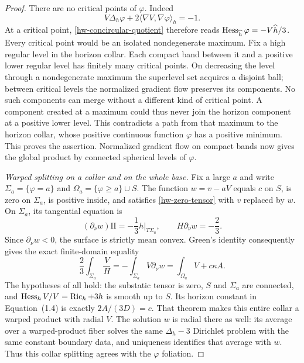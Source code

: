 \begin{proof}
There are no critical points of $\varphi$.
Indeed
\[
 V\Delta_h\varphi+2\langle\nabla V,\nabla\varphi\rangle_h=-1.
\]
At a critical point, \eqref{hw-concircular-quotient} therefore
reads
$\operatorname{Hess}_{\widehat h}\varphi=-V\widehat h/3$.
Every critical point would be an isolated nondegenerate maximum.
Fix a high regular level in the horizon collar.  Each compact band
between it and a positive lower regular level has finitely many
critical points.  On decreasing the level through a nondegenerate
maximum the superlevel set acquires a disjoint ball; between
critical levels the normalized gradient flow preserves its
components.  No such components can merge without a different
kind of critical point.  A component created at a maximum could
thus never join the horizon component at a positive lower level.
This contradicts a path from that maximum to the horizon collar,
whose positive continuous function $\varphi$ has a positive
minimum.  This proves the assertion.
Normalized gradient flow on compact bands now gives the global
product by connected spherical levels of $\varphi$.

\emph{Warped splitting on a collar and on the whole base.}
Fix a large $a$ and write $\Sigma_a=\{\varphi=a\}$ and
$\Omega_a=\{\varphi\geq a\}\cup S$.
The function $w=v-aV$ equals $c$ on $S$, is zero on $\Sigma_a$,
is positive inside, and satisfies \eqref{hw-zero-tensor} with
$v$ replaced by $w$.  On $\Sigma_a$, its tangential equation is
\[
 (\partial_\nu w)\mathrm{II}=-\frac13h|_{T\Sigma_a},
 \qquad H\partial_\nu w=-\frac23.
\]
Since $\partial_\nu w<0$, the surface is strictly mean convex.
Green's identity consequently gives the exact finite-domain
equality
\[
 \frac23\int_{\Sigma_a}\frac{V}{H}
       =-\int_{\Sigma_a}V\partial_\nu w
       =\int_{\Omega_a}V+c\kappa A.
\]
The hypotheses of
\cite[Theorem~1.1]{borghinifogagnolopinamonti2024} all hold:
the substatic tensor is zero, $S$ and $\Sigma_a$ are connected,
and $\operatorname{Hess}_hV/V=\operatorname{Ric}_h+3h$ is smooth up to $S$.
Its horizon constant in Equation~(1.4) is exactly
$2A/(3D)=c$.  That theorem makes this entire collar a warped
product with radial $V$.  The solution $w$ is radial there as well:
its average over a warped-product fiber solves the same
$\Delta_h-3$ Dirichlet problem with the same constant boundary
data, and uniqueness identifies that average with $w$.
Thus this collar splitting agrees with the $\varphi$ foliation.


\end{proof}
